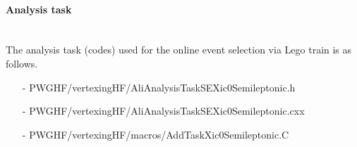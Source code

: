 
\vspace{\columnsep}
\paragraph{Analysis task}\mbox{}\\
The analysis task (codes) used for the online event selection via Lego train is as follows.
%
\begin{itemize}
    \small
    \item[]  \vspace{1pt}
    \item[-] PWGHF/vertexingHF/AliAnalysisTaskSEXic0Semileptonic.h
    \item[-] PWGHF/vertexingHF/AliAnalysisTaskSEXic0Semileptonic.cxx
    \item[-] PWGHF/vertexingHF/macros/AddTaskXic0Semileptonic.C
\end{itemize}


\vspace{\columnsep}
